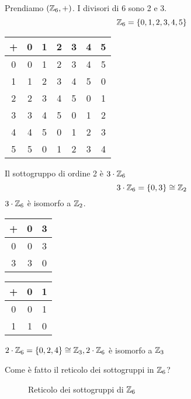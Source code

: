 \begin{exmp}
Prendiamo $(\mathbb{Z}_6, +)$. I divisori di 6 sono 2 e 3.
\[
\mathbb{Z}_6 = \{ 0, 1, 2, 3, 4, 5 \}
\]
\begin{table}[ht]
\centering
\begin{tabular}{c|*{6}{c}}
+ & 0 & 1 & 2 & 3 & 4 & 5 \\
\hline
0 & 0 & 1 & 2 & 3 & 4 & 5 \\
1 & 1 & 2 & 3 & 4 & 5 & 0 \\
2 & 2 & 3 & 4 & 5 & 0 & 1 \\
3 & 3 & 4 & 5 & 0 & 1 & 2 \\
4 & 4 & 5 & 0 & 1 & 2 & 3 \\
5 & 5 & 0 & 1 & 2 & 3 & 4
\end{tabular}
\end{table}

Il sottogruppo di ordine 2 \`e $3 \cdot \mathbb{Z}_6$
\[
3 \cdot \mathbb{Z}_6 = \{ 0, 3 \} \cong \mathbb{Z}_2
\]
$3 \cdot \mathbb{Z}_6$ \`e isomorfo a $\mathbb{Z}_2$.
\begin{table}[ht]
\centering
\begin{tabular}{c|cc}
+ & 0 & 3 \\
\hline
0 & 0 & 3 \\
3 & 3 & 0
\end{tabular}
\qquad
\begin{tabular}{c|cc}
+ & 0 & 1 \\
\hline
0 & 0 & 1 \\
1 & 1 & 0
\end{tabular}
\end{table}

$2 \cdot \mathbb{Z}_6 = \{ 0, 2, 4 \} \cong \mathbb{Z}_3, 2 \cdot \mathbb{Z}_6$ \`e isomorfo a $\mathbb{Z}_3$

Come \`e fatto il reticolo dei sottogruppi in $\mathbb{Z}_6$?

\begin{figure}
\centering
{}
\caption{Reticolo dei sottogruppi di $\mathbb{Z}_6$}
\end{figure}


\end{exmp}
